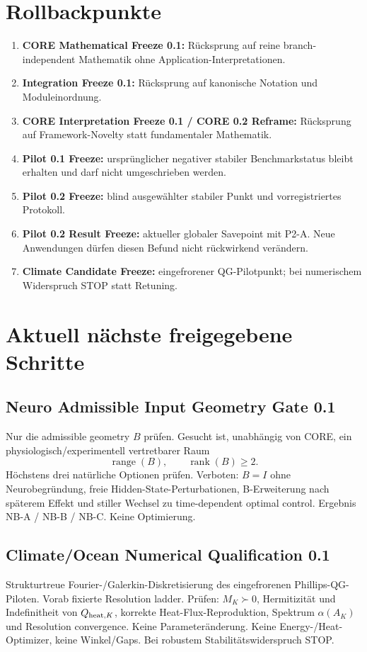 \section{Rollbackpunkte}
\begin{enumerate}
\item \textbf{CORE Mathematical Freeze 0.1:} Rücksprung auf reine branch-independent Mathematik ohne Application-Interpretationen.
\item \textbf{Integration Freeze 0.1:} Rücksprung auf kanonische Notation und Moduleinordnung.
\item \textbf{CORE Interpretation Freeze 0.1 / CORE 0.2 Reframe:} Rücksprung auf Framework-Novelty statt fundamentaler Mathematik.
\item \textbf{Pilot 0.1 Freeze:} ursprünglicher negativer stabiler Benchmarkstatus bleibt erhalten und darf nicht umgeschrieben werden.
\item \textbf{Pilot 0.2 Freeze:} blind ausgewählter stabiler Punkt und vorregistriertes Protokoll.
\item \textbf{Pilot 0.2 Result Freeze:} aktueller globaler Savepoint mit P2-A. Neue Anwendungen dürfen diesen Befund nicht rückwirkend verändern.
\item \textbf{Climate Candidate Freeze:} eingefrorener QG-Pilotpunkt; bei numerischem Widerspruch STOP statt Retuning.
\end{enumerate}

\section{Aktuell nächste freigegebene Schritte}
\subsection{Neuro Admissible Input Geometry Gate 0.1}
Nur die admissible geometry $B$ prüfen. Gesucht ist, unabhängig von CORE, ein physiologisch/experimentell vertretbarer Raum
\[
\operatorname{range}(B),\qquad \operatorname{rank}(B)\ge2.
\]
Höchstens drei natürliche Optionen prüfen. Verboten: $B=I$ ohne Neurobegründung, freie Hidden-State-Perturbationen, B-Erweiterung nach späterem Effekt und stiller Wechsel zu time-dependent optimal control. Ergebnis NB-A / NB-B / NB-C. Keine Optimierung.

\subsection{Climate/Ocean Numerical Qualification 0.1}
Strukturtreue Fourier-/Galerkin-Diskretisierung des eingefrorenen Phillips-QG-Piloten. Vorab fixierte Resolution ladder. Prüfen: $M_K\succ0$, Hermitizität und Indefinitheit von $Q_{{\rm heat},K}$, korrekte Heat-Flux-Reproduktion, Spektrum $\alpha(A_K)$ und Resolution convergence. Keine Parameteränderung. Keine Energy-/Heat-Optimizer, keine Winkel/Gaps. Bei robustem Stabilitätswiderspruch STOP.
